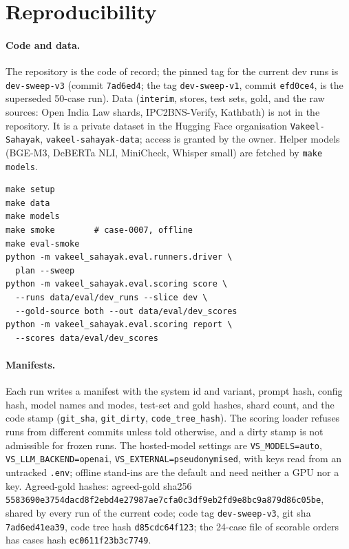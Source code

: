 \section{Reproducibility}
\label{app:repro}

\paragraph{Code and data.} The repository is the code of record; the pinned tag for the current dev runs is \texttt{dev-sweep-v3} (commit \texttt{7ad6ed4}; the tag \texttt{dev-sweep-v1}, commit \texttt{efd0ce4}, is the superseded 50-case run). Data (\texttt{interim}, stores, test sets, gold, and the raw sources: Open India Law shards, IPC2BNS-Verify, Kathbath) is not in the repository. It is a private dataset in the Hugging Face organisation \texttt{Vakeel-Sahayak}, \texttt{vakeel-sahayak-data}; access is granted by the owner. Helper models (BGE-M3, DeBERTa NLI, MiniCheck, Whisper small) are fetched by \texttt{make models}.

{\footnotesize\begin{verbatim}
make setup
make data
make models
make smoke        # case-0007, offline
make eval-smoke
python -m vakeel_sahayak.eval.runners.driver \
  plan --sweep
python -m vakeel_sahayak.eval.scoring score \
  --runs data/eval/dev_runs --slice dev \
  --gold-source both --out data/eval/dev_scores
python -m vakeel_sahayak.eval.scoring report \
  --scores data/eval/dev_scores
\end{verbatim}}

\paragraph{Manifests.} Each run writes a manifest with the system id and variant, prompt hash, config hash, model names and modes, test-set and gold hashes, shard count, and the code stamp (\texttt{git\_sha}, \texttt{git\_dirty}, \texttt{code\_tree\_hash}). The scoring loader refuses runs from different commits unless told otherwise, and a dirty stamp is not admissible for frozen runs. The hosted-model settings are \texttt{VS\_MODELS=auto}, \texttt{VS\_LLM\_BACKEND=openai}, \texttt{VS\_EXTERNAL=pseudonymised}, with keys read from an untracked \texttt{.env}; offline stand-ins are the default and need neither a GPU nor a key. Agreed-gold hashes: agreed-gold sha256 \texttt{5583690e3754dacd8f2ebd4e27987ae7cfa0c3df9eb2fd9e8bc9a879d86c05be}, shared by every run of the current code; code tag \texttt{dev-sweep-v3}, git sha \texttt{7ad6ed41ea39}, code tree hash \texttt{d85cdc64f123}; the 24-case file of scorable orders has cases hash \texttt{ec0611f23b3c7749}.

